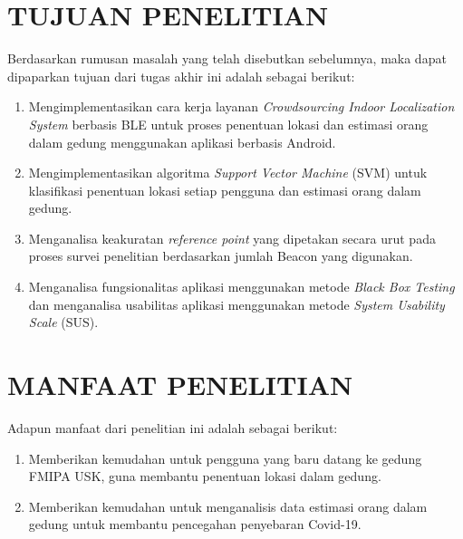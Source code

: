 \section{\uppercase{TUJUAN PENELITIAN}}
Berdasarkan rumusan masalah yang telah disebutkan sebelumnya, maka dapat dipaparkan tujuan dari tugas akhir ini adalah sebagai berikut:
\begin{enumerate}
	\item Mengimplementasikan cara kerja layanan \textit{Crowdsourcing Indoor Localization System} berbasis BLE untuk proses penentuan lokasi dan estimasi orang dalam gedung menggunakan aplikasi berbasis Android.
	\item Mengimplementasikan algoritma \textit{\textit{Support Vector Machine}} (SVM) untuk klasifikasi penentuan lokasi setiap pengguna dan estimasi orang dalam gedung.
	\item Menganalisa keakuratan \textit{reference point} yang dipetakan secara urut pada proses survei penelitian berdasarkan jumlah Beacon yang digunakan.
	\item Menganalisa fungsionalitas aplikasi menggunakan metode \textit{Black Box Testing} dan menganalisa usabilitas aplikasi menggunakan metode \textit{System Usability Scale} (SUS).
\end{enumerate}


\section{\uppercase{MANFAAT PENELITIAN}}
Adapun manfaat dari penelitian ini adalah sebagai berikut:
\begin{enumerate}
	\item Memberikan kemudahan untuk pengguna yang baru datang ke gedung FMIPA USK, guna membantu penentuan lokasi dalam gedung.
	\item Memberikan kemudahan untuk menganalisis data estimasi orang dalam gedung untuk membantu pencegahan penyebaran Covid-19.

\end{enumerate}


\begin{comment}

\end{comment}
